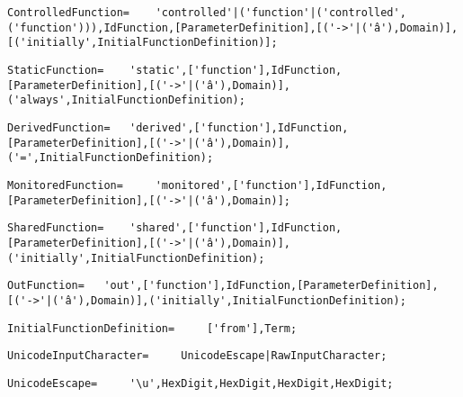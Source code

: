 \documentclass{article}
\begin{document}
    \begin{lstlisting}[mathescape=true]
     ControlledFunction= 	'controlled'|('function'|('controlled',('function'))),IdFunction,[ParameterDefinition],[('->'|('â'),Domain)],[('initially',InitialFunctionDefinition)];
    \end{lstlisting}
    
    \begin{lstlisting}[mathescape=true]
     StaticFunction= 	'static',['function'],IdFunction,[ParameterDefinition],[('->'|('â'),Domain)],('always',InitialFunctionDefinition);
    \end{lstlisting}
    
    \begin{lstlisting}[mathescape=true]
     DerivedFunction= 	'derived',['function'],IdFunction,[ParameterDefinition],[('->'|('â'),Domain)],('=',InitialFunctionDefinition);
    \end{lstlisting}
    
    \begin{lstlisting}[mathescape=true]
     MonitoredFunction= 	'monitored',['function'],IdFunction,[ParameterDefinition],[('->'|('â'),Domain)];
    \end{lstlisting}
    
    \begin{lstlisting}[mathescape=true]
     SharedFunction= 	'shared',['function'],IdFunction,[ParameterDefinition],[('->'|('â'),Domain)],('initially',InitialFunctionDefinition);
    \end{lstlisting}
    
    \begin{lstlisting}[mathescape=true]
     OutFunction= 	'out',['function'],IdFunction,[ParameterDefinition],[('->'|('â'),Domain)],('initially',InitialFunctionDefinition);
    \end{lstlisting}
    
    \begin{lstlisting}[mathescape=true]
     InitialFunctionDefinition= 	['from'],Term;
    \end{lstlisting}
    
    \begin{lstlisting}[mathescape=true]
     UnicodeInputCharacter= 	UnicodeEscape|RawInputCharacter;
    \end{lstlisting}
    
    \begin{lstlisting}[mathescape=true]
     UnicodeEscape= 	'\u',HexDigit,HexDigit,HexDigit,HexDigit;
    \end{lstlisting}
    
\end{document}
